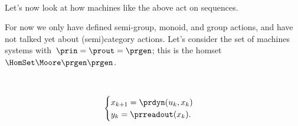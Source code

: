 \

\

\


\

\

\




Let's now look at how machines like the above act on sequences.

For now we only have defined semi-group, monoid, and group actions, and have not talked yet about (semi)category actions.
Let's consider the set of machines systems with~$\prin = \prout = \prgen$; this is the homset~$\HomSet\Moore\prgen\prgen$.


\

\begin{equation}
    \begin{cases}
        x_{k+1} = \prdyn(u_k, x_k) \\
        y_{k}   = \prreadout(x_{k}).
    \end{cases}
\end{equation}

\


